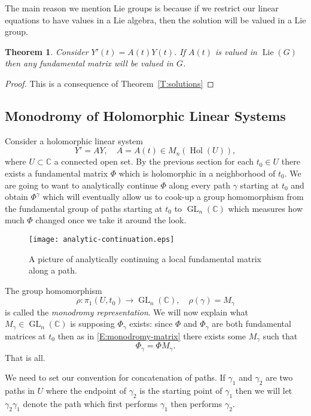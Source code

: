 \documentclass[12pt]{book}
\numberwithin{equation}{section}
\newtheorem{theorem}{Theorem}[subsection]
\theoremstyle{definition}
\theoremstyle{remark}
\newcommand{\CC}{\mathbb{C}}
\newcommand{\hol}{\operatorname{Hol}}
\newcommand{\GL}{\operatorname{GL}}
\newcommand{\Lie}{\operatorname{Lie}}
\begin{document}
The main reason we mention Lie groups is because if we restrict our linear equations to have values in a Lie algebra, then the solution will be valued in a Lie group.
\begin{theorem}
	Consider $Y'(t)=A(t)Y(t)$. If $A(t)$ is valued in $\Lie(G)$ then any fundamental matrix will be valued in $G$. 
\end{theorem}
\begin{proof}
	This is a consequence of Theorem~\ref{T:solutions}
\end{proof}



\subsection{Monodromy of Holomorphic Linear Systems}

Consider a holomorphic linear system 
$$Y'=AY, \quad A=A(t) \in M_n(\hol(U)),$$ 
where $U\subset \CC$ a connected open set. 
By the previous section for each $t_0 \in U$ there exists a fundamental matrix $\Phi$ which is holomorphic in a neighborhood of $t_0$.
We are going to want to analytically continue $\Phi$ along every path $\gamma$ starting at $t_0$ and obtain $\Phi^{\gamma}$ which will eventually allow us to cook-up a group homomorphism from the fundamental group of paths starting at $t_0$ to $\GL_n(\CC)$ which measures how much $\Phi$ changed once we take it around the look. 

\begin{figure}[h]
	\begin{center}
	\texttt{[image: analytic-continuation.eps]}
	\end{center}
\caption{A picture of analytically continuing a local fundamental matrix along a path.}
\end{figure}

The group homomorphism 
 $$ \rho: \pi_1(U,t_0) \to \GL_n(\CC), \quad \rho(\gamma) = M_{\gamma}$$
is called the \emph{monodromy representation}.
We will now explain what $M_{\gamma}\in \GL_n(\CC)$ is  supposing $\Phi_{\gamma}$ exists:
since $\Phi$ and $\Phi_{\gamma}$ are both fundamental matrices at $t_0$ then as in  \eqref{E:monodromy-matrix} there exists some $M_{\gamma}$ such that 
 $$ \Phi_{\gamma} = \Phi M_{\gamma}.$$
That is all.

We need to set our convention for concatenation of paths. 
If $\gamma_1$ and $\gamma_2$ are two paths in $U$ where the endpoint of $\gamma_2$ is the starting point of $\gamma_1$ then we will let $\gamma_2\gamma_1$ denote the path which first performs $\gamma_1$ then performs $\gamma_2$. 
\end{document}

